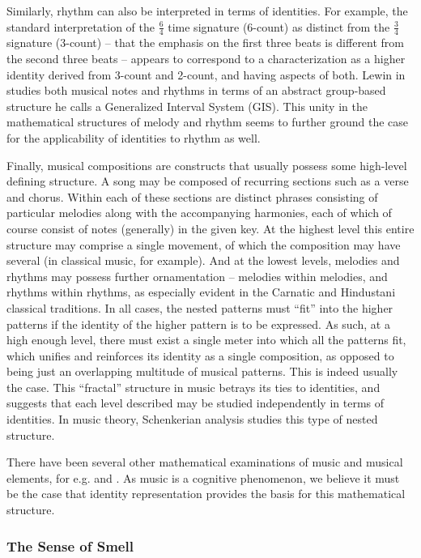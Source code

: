 \documentclass[pra,twocolumn,groupedaddress,10pt]{revtex4}
\theoremstyle{definition}
\begin{document}
Similarly, rhythm can also be interpreted in terms of identities. For example, the standard interpretation of the $\frac{6}{4}$ time signature (6-count) as distinct from the $\frac{3}{4}$ signature (3-count) -- that the emphasis on the first three beats is different from the second three beats -- appears to correspond to a characterization as a higher identity derived from 3-count and 2-count, and having aspects of both. Lewin in \cite{gmit} studies both musical notes and rhythms in terms of an abstract group-based structure he calls a Generalized Interval System (GIS). This unity in the mathematical structures of melody and rhythm seems to further ground the case for the applicability of identities to rhythm as well.

Finally, musical compositions are constructs that usually possess some high-level defining structure. A song may be composed of recurring sections such as a verse and chorus. Within each of these sections are distinct phrases consisting of particular melodies along with the accompanying harmonies, each of which of course consist of notes (generally) in the given key. At the highest level this entire structure may comprise a single movement, of which the composition may have several (in classical music, for example). And at the lowest levels, melodies and rhythms may possess further ornamentation -- melodies within melodies, and rhythms within rhythms, as especially evident in the Carnatic and Hindustani classical traditions. In all cases, the nested patterns must ``fit'' into the higher patterns if the identity of the higher pattern is to be expressed. As such, at a high enough level, there must exist a single meter into which all the patterns fit, which unifies and reinforces its identity as a single composition, as opposed to being just an overlapping multitude of musical patterns. This is indeed usually the case. This ``fractal'' structure in music betrays its ties to identities, and suggests that each level described may be studied independently in terms of identities. In music theory, Schenkerian analysis\cite{schenker} studies this type of nested structure.

There have been several other mathematical examinations of music and musical elements, for e.g. \cite{musicmath} and \cite{musselfsim}. As music is a cognitive phenomenon, we believe it must be the case that identity representation provides the basis for this mathematical structure.

\subsubsection{The Sense of Smell} \label{sec:sensme}
\end{document}
